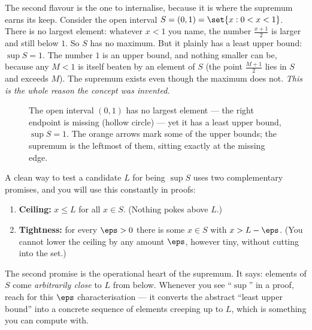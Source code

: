 The second flavour is the one to internalise, because it is where the supremum earns its
keep. Consider the open interval $S = (0,1) = \set{x : 0 < x < 1}$. There is no largest
element: whatever $x<1$ you name, the number $\frac{x+1}{2}$ is larger and still below
$1$. So $S$ has no maximum. But it plainly has a least upper bound: $\sup S = 1$. The
number $1$ is an upper bound, and nothing smaller can be, because any $M<1$ is itself
beaten by an element of $S$ (the point $\frac{M+1}{2}$ lies in $S$ and exceeds $M$). The
supremum exists even though the maximum does not. \emph{This is the whole reason the
concept was invented.}

\begin{figure}[H]
\centering
{}
\caption{The open interval $(0,1)$ has no largest element --- the right endpoint is
missing (hollow circle) --- yet it has a least upper bound, $\sup S = 1$. The orange
arrows mark some of the upper bounds; the supremum is the leftmost of them, sitting
exactly at the missing edge.}
\label{ch41:fig-sup}
\end{figure}

\begin{focusbox}
A clean way to test a candidate $L$ for being $\sup S$ uses two complementary promises,
and you will use this constantly in proofs:
\begin{enumerate}
  \item \textbf{Ceiling:} $x \le L$ for all $x\in S$. (Nothing pokes above $L$.)
  \item \textbf{Tightness:} for every $\eps>0$ there is some $x\in S$ with $x > L-\eps$.
        (You cannot lower the ceiling by any amount $\eps$, however tiny, without
        cutting into the set.)
\end{enumerate}
The second promise is the operational heart of the supremum. It says: elements of $S$ come
\emph{arbitrarily close} to $L$ from below. Whenever you see ``$\sup$'' in a proof,
reach for this $\eps$ characterisation --- it converts the abstract ``least upper bound''
into a concrete sequence of elements creeping up to $L$, which is something you can
compute with.
\end{focusbox}

